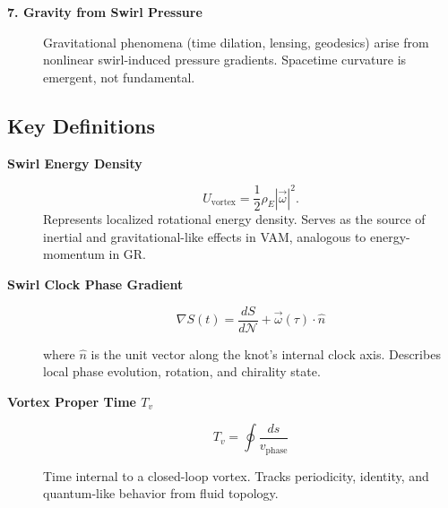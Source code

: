 \documentclass[preprint]{revtex4-2}
\begin{document}
\begin{description}
        \item[\textbf{7. Gravity from Swirl Pressure}]%
        Gravitational phenomena (time dilation, lensing, geodesics) arise from nonlinear swirl-induced pressure gradients. Spacetime curvature is emergent, not fundamental.
    \end{description}


    \subsection*{Key Definitions}

    \begin{description}

        \item[\textbf{Swirl Energy Density}]%
        \[
            U_{\text{vortex}} = \frac{1}{2} \rho_{\scriptscriptstyle\boldsymbol\!E} |\vec{\omega}|^2.
        \]
        Represents localized rotational energy density. Serves as the source of inertial and gravitational-like effects in VAM, analogous to energy-momentum in GR.

        \item[\textbf{Swirl Clock Phase Gradient}]%

        \begin{equation}
            \boxed{
                \nabla S(t) = \frac{dS}{d\mathcal{N}} + \vec{\omega}(\tau) \cdot \hat{n}
            }
            \label{eq:swirl-clock-gradient}
        \end{equation}

        where \( \hat{n} \) is the unit vector along the knot’s internal clock axis. Describes local phase evolution, rotation, and chirality state.

        \item[\textbf{Vortex Proper Time \( T_v \)}]%

        \begin{equation}
            \boxed{
                T_v = \oint \frac{ds}{v_\text{phase}}
            }
            \label{eq:vortex-proper-time}
        \end{equation}

        Time internal to a closed-loop vortex. Tracks periodicity, identity, and quantum-like behavior from fluid topology.
    \end{description}

\end{document}
